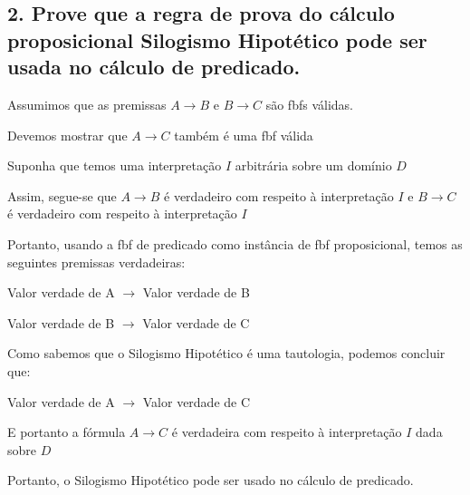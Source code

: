 \subsection*{2. Prove que a regra de prova do cálculo proposicional Silogismo Hipotético pode ser usada no
	cálculo de predicado.}

Assumimos que as premissas $A \rightarrow B$ e $B \rightarrow C$ são fbfs válidas.


Devemos mostrar que $A \rightarrow C$ também é uma fbf válida


Suponha que temos uma interpretação $I$ arbitrária sobre um domínio $D$


Assim, segue-se que $A \rightarrow B$ é verdadeiro com respeito à interpretação $I$ e $B \rightarrow C$ é verdadeiro com respeito à interpretação $I$


Portanto, usando a fbf de predicado como instância de fbf proposicional, temos as seguintes premissas verdadeiras:


Valor verdade de A $\rightarrow$ Valor verdade de B


Valor verdade de B $\rightarrow$ Valor verdade de C


Como sabemos que o Silogismo Hipotético é uma tautologia, podemos concluir que:


Valor verdade de A $\rightarrow$ Valor verdade de C


E portanto a fórmula $A \rightarrow C$ é verdadeira com respeito à interpretação $I$ dada sobre $D$


Portanto, o Silogismo Hipotético pode ser usado no cálculo de predicado.

